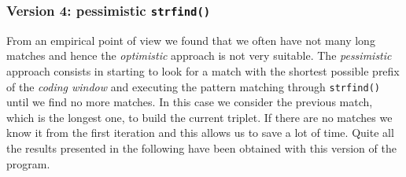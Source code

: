 \subsubsection{Version 4: pessimistic \texttt{strfind()}} \label{subsubsec:pess}
From an empirical point of view we found that we often have not many long matches and hence the \textit{optimistic} approach is not very suitable. The \textit{pessimistic} approach consists in starting to look for a match with the shortest possible prefix of the \textit{coding window} and executing the pattern matching through \texttt{strfind()} until we find no more matches. In this case we consider the previous match, which is the longest one, to build the current triplet. If there are no matches we know it from the first iteration and this allows us to save a lot of time. Quite all the results presented in the following have been obtained with this version of the program.